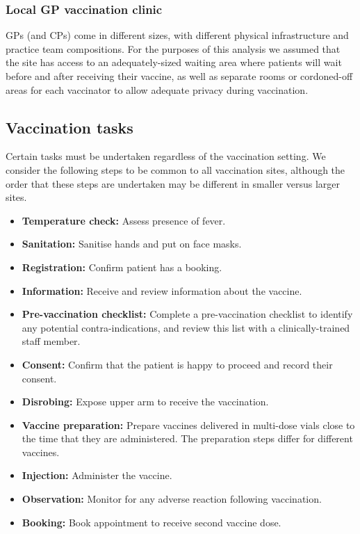 \documentclass{article}
\begin{document}
\hypertarget{local-gp-vaccination-clinic}{%
\subsubsection{Local GP vaccination
clinic}\label{local-gp-vaccination-clinic}}

GPs (and CPs) come in different sizes, with different physical
infrastructure and practice team compositions. For the purposes of this
analysis we assumed that the site has access to an adequately-sized
waiting area where patients will wait before and after receiving their
vaccine, as well as separate rooms or cordoned-off areas for each
vaccinator to allow adequate privacy during vaccination.

\hypertarget{vaccination-tasks}{%
\subsection{Vaccination tasks}\label{vaccination-tasks}}

Certain tasks must be undertaken regardless of the vaccination setting.
We consider the following steps to be common to all vaccination sites,
although the order that these steps are undertaken may be different in
smaller versus larger sites.

\begin{itemize}
\tightlist
\item
  \textbf{Temperature check:} Assess presence of fever.
\item
  \textbf{Sanitation:} Sanitise hands and put on face masks.
\item
  \textbf{Registration:} Confirm patient has a booking.
\item
  \textbf{Information:} Receive and review information about the
  vaccine.
\item
  \textbf{Pre-vaccination checklist:} Complete a pre-vaccination
  checklist to identify any potential contra-indications, and review
  this list with a clinically-trained staff member.
\item
  \textbf{Consent:} Confirm that the patient is happy to proceed and
  record their consent.
\item
  \textbf{Disrobing:} Expose upper arm to receive the vaccination.
\item
  \textbf{Vaccine preparation:} Prepare vaccines delivered in multi-dose
  vials close to the time that they are administered. The preparation
  steps differ for different vaccines.
\item
  \textbf{Injection:} Administer the vaccine.
\item
  \textbf{Observation:} Monitor for any adverse reaction following
  vaccination.\\
\item
  \textbf{Booking:} Book appointment to receive second vaccine dose.
\end{itemize}
\end{document}
